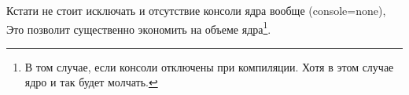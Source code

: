 Кстати не стоит исключать и отсутствие консоли ядра вообще (console=none), Это
позволит существенно экономить на объеме ядра\footnote{В том случае, если
консоли отключены при компиляции. Хотя в этом случае ядро и так будет молчать.}.


%
%
%
%
%
%
%
%
%
%
